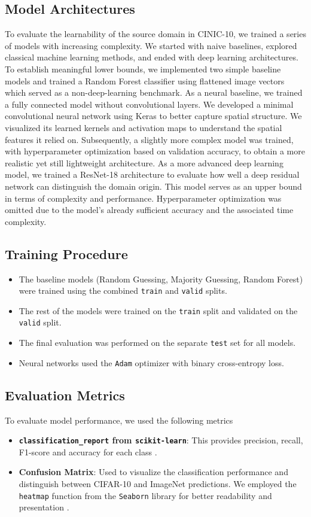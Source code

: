 \subsection{Model Architectures}
To evaluate the learnability of the source domain in CINIC-10, we trained a series of models with increasing complexity. We started with naive 
baselines, explored classical machine learning methods, and ended with deep learning architectures.
To establish meaningful lower bounds, we implemented two simple baseline models and trained a Random Forest classifier using flattened image vectors
which served as a non-deep-learning benchmark.
As a neural baseline, we trained a fully connected model without convolutional layers.
We developed a minimal convolutional neural network using Keras to better capture spatial structure.
We visualized its learned kernels and activation maps to understand the spatial features it relied on. 
Subsequently, a slightly more complex model was trained, with hyperparameter optimization based on validation accuracy, 
to obtain a more realistic yet still lightweight architecture.
As a more advanced deep learning model, we trained a ResNet-18 architecture to evaluate how well a deep residual network can distinguish the domain origin.
This model serves as an upper bound in terms of complexity and performance. Hyperparameter optimization was omitted due to the model's already 
sufficient accuracy and the associated time complexity.


\subsection{Training Procedure}
\begin{itemize}
    \item The baseline models (Random Guessing, Majority Guessing, Random Forest) were trained using the combined \texttt{train} and \texttt{valid} splits.
    \item The rest of the models were trained on the \texttt{train} split and validated on the \texttt{valid} split.
    \item The final evaluation was performed on the separate \texttt{test} set for all models.
    \item Neural networks used the \texttt{Adam} optimizer with binary cross-entropy loss.
\end{itemize}

\subsection{Evaluation Metrics}
To evaluate model performance, we used the following metrics
\begin{itemize}
    \item \textbf{\texttt{classification\_report} from \texttt{scikit-learn}}: This provides precision, recall, F1-score and accuracy for each class \cite{scikit-learn}.
    \item \textbf{Confusion Matrix}: Used to visualize the classification performance and distinguish between CIFAR-10 and ImageNet predictions. We 
    employed the \texttt{heatmap} function from the \texttt{Seaborn} library for better readability and presentation \cite{Waskom2021}.
\end{itemize}